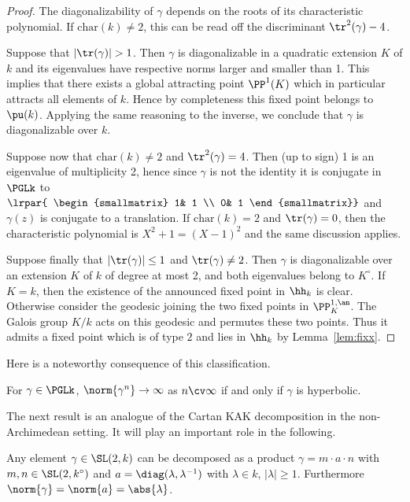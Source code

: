 \begin{proof}
The diagonalizability of $\gamma$ depends on the roots of its characteristic polynomial.
If $\mathrm{char}(k)\neq 2$, this can be read off the discriminant $\tr^2(\gamma)-4$.

Suppose that $\mathopen|\tr(\gamma)\mathclose| >1$. Then $\gamma$ is diagonalizable in a quadratic extension $K$ of $k$ and its eigenvalues have respective norms larger and smaller than 1. This implies that there exists a global attracting point $\PP^1(K)$ which in particular attracts all elements of $k$. Hence by completeness this fixed point belongs to $\pu(k)$. Applying the same reasoning to the inverse, we conclude that $\gamma$ is diagonalizable over $k$.


Suppose now that $\mathrm{char}(k)\neq 2$ and $\tr^2(\gamma) =4$. Then (up to sign) 1 is an eigenvalue of multiplicity 2, hence since $\gamma$ is not the identity it is conjugate in $\PGLk$ to $\lrpar{
\begin{smallmatrix} 1& 1 \\ 0& 1
\end{smallmatrix}}$ and $\gamma(z)$ is conjugate to a translation.
If $\mathrm{char}(k)=2$ and $\tr(\gamma) = 0$, then the characteristic polynomial is $X^2+1 = (X-1)^2$ and the same discussion applies.

Suppose finally that $\mathopen|\tr(\gamma)\mathclose|\leq 1$ and $\tr(\gamma) \neq 2$. Then $\gamma$ is diagonalizable over an extension $K$ of $k$ of degree at most 2, and both eigenvalues belong to $K^\circ$. If $K=k$, then the existence of the announced fixed point in $\hh_k$ is clear. Otherwise consider the geodesic joining the two fixed points in $\PP^{1,\an}_K$. The Galois group $K/k$ acts on this geodesic and permutes these two points. Thus it admits a fixed point which is of type $2$ and lies in $\hh_k$ by Lemma~\ref{lem:fixx}.
\end{proof}

Here is a noteworthy consequence of this classification.

\begin{coro}
For $\gamma\in \PGLk$, $\norm{\gamma^n} \to \infty$ as $n\cv\infty$ if and only if $\gamma$ is hyperbolic.
\end{coro}

The next result is an analogue of the Cartan KAK decomposition in the non-Archimedean setting. It will play an important role in the following.

\begin{prop}\label{prop:KAK}
Any element $\gamma\in \SL(2,k)$ can be decomposed as a product $\gamma= m\cdot a \cdot n$ with $m,n \in \SL(2,k^\circ)$ and $a = \diag (\lambda, \lambda^{-1})$ with $\lambda\in k$, $|\lambda|\ge 1$. Furthermore $\norm{\gamma} = \norm{a} = \abs{\lambda}$.
\end{prop}

